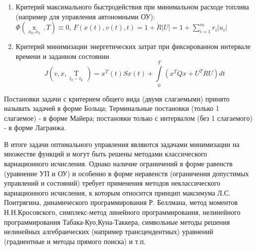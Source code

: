 \documentclass[preprint,russian,a5paper,10pt,twoside]{ncc}
\begin{document}
\begin{itemize}
\begin{enumerate}[resume]
  \item Критерий максимального быстродействия при минимальном расходе топлива (например для управления автономными ОУ):\\\begin{math}\Phi \left( \underset{{{x}_{0}},{{x}_{k}}}{\mathop{x\left( T \right)}}\,,T \right)\equiv 0\end{math}, \begin{math}F\left( x\left( t \right),v\left( t \right),t \right)=1+\dot{R}\left| U \right|=1+\sum\limits_{i=1}^{m}{{{r}_{i}}}\left| {{u}_{i}} \right|\end{math} 

\item Критерий минимизации энергетических затрат при фиксированном интервале времени и заданном состоянии 
\[J\left( v,x,\underset{{{t}_{0}}-{{t}_{k}}}{\mathop{T}}\, \right)={{x}^{T}}\left( t \right)Sx\left( t \right)+\int\limits_{0}^{T}{\left( {{x}^{T}}Qx+{{U}^{T}}RU \right)}dt\]

 
 \end{enumerate}
Постановки задачи с критерием общего вида (двумя слагаемыми) принято называть задачей в форме Больца; Терминальные постановки (только 1 слагаемое) - в форме Майера; постановки только с интервалом (без 1 слагаемого) - в форме Лагранжа.
\end{itemize}

В итоге задачи оптимального управления являются задачами минимизации на множестве функций и могут быть решены методами классического вариационного исчисления. Однако наличие ограничений в форме равенств (уравнение УП и ОУ) и особенно в форме неравенств (ограничения допустимых управлений и состояний) требует применения методов неклассического вариационного исчисления, к которым относится принцип максимума Л.С. Понтрягина, динамического программирования Р. Беллмана, метод моментов Н.Н.Кросовского, симплекс-метод линейного программирования, нелинейного программирования Табака-Куо,Куна-Таккера, символьные методы решения нелинейных алгебраических (например трансцендентных) уравнений (градиентные и методы прямого поиска) и т.п.
\par
\end{document}
